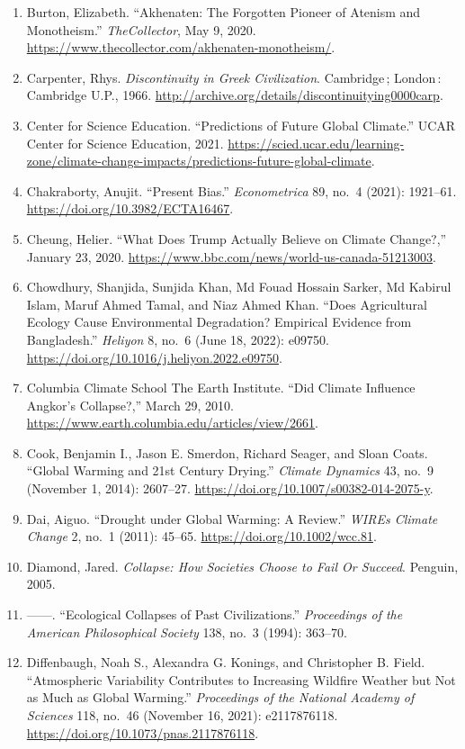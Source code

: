 \documentclass[12pt]{article}
\begin{document}
\begin{enumerate}[leftmargin=*]
\item Burton, Elizabeth. ``Akhenaten: The Forgotten Pioneer of Atenism and Monotheism.'' \textit{TheCollector}, May 9, 2020. \url{https://www.thecollector.com/akhenaten-monotheism/}.
\item Carpenter, Rhys. \textit{Discontinuity in Greek Civilization}. Cambridge\,; London\,: Cambridge U.P., 1966. \url{http://archive.org/details/discontinuitying0000carp}.
\item Center for Science Education. ``Predictions of Future Global Climate.'' UCAR Center for Science Education, 2021. \url{https://scied.ucar.edu/learning-zone/climate-change-impacts/predictions-future-global-climate}.
\item Chakraborty, Anujit. ``Present Bias.'' \textit{Econometrica} 89, no.\ 4 (2021): 1921--61. \url{https://doi.org/10.3982/ECTA16467}.
\item Cheung, Helier. ``What Does Trump Actually Believe on Climate Change?,'' January 23, 2020. \url{https://www.bbc.com/news/world-us-canada-51213003}.
\item Chowdhury, Shanjida, Sunjida Khan, Md Fouad Hossain Sarker, Md Kabirul Islam, Maruf Ahmed Tamal, and Niaz Ahmed Khan. ``Does Agricultural Ecology Cause Environmental Degradation? Empirical Evidence from Bangladesh.'' \textit{Heliyon} 8, no.\ 6 (June 18, 2022): e09750. \url{https://doi.org/10.1016/j.heliyon.2022.e09750}.
\item Columbia Climate School The Earth Institute. ``Did Climate Influence Angkor’s Collapse?,'' March 29, 2010. \url{https://www.earth.columbia.edu/articles/view/2661}.
\item Cook, Benjamin I., Jason E. Smerdon, Richard Seager, and Sloan Coats. ``Global Warming and 21st Century Drying.'' \textit{Climate Dynamics} 43, no.\ 9 (November 1, 2014): 2607--27. \url{https://doi.org/10.1007/s00382-014-2075-y}.
\item Dai, Aiguo. ``Drought under Global Warming: A Review.'' \textit{WIREs Climate Change} 2, no.\ 1 (2011): 45--65. \url{https://doi.org/10.1002/wcc.81}.
\item Diamond, Jared. \textit{Collapse: How Societies Choose to Fail Or Succeed}. Penguin, 2005.
\item ---{}---. ``Ecological Collapses of Past Civilizations.'' \textit{Proceedings of the American Philosophical Society} 138, no.\ 3 (1994): 363--70.
\item Diffenbaugh, Noah S., Alexandra G. Konings, and Christopher B. Field. ``Atmospheric Variability Contributes to Increasing Wildfire Weather but Not as Much as Global Warming.'' \textit{Proceedings of the National Academy of Sciences} 118, no.\ 46 (November 16, 2021): e2117876118. \url{https://doi.org/10.1073/pnas.2117876118}.

\end{enumerate}
\end{document}

